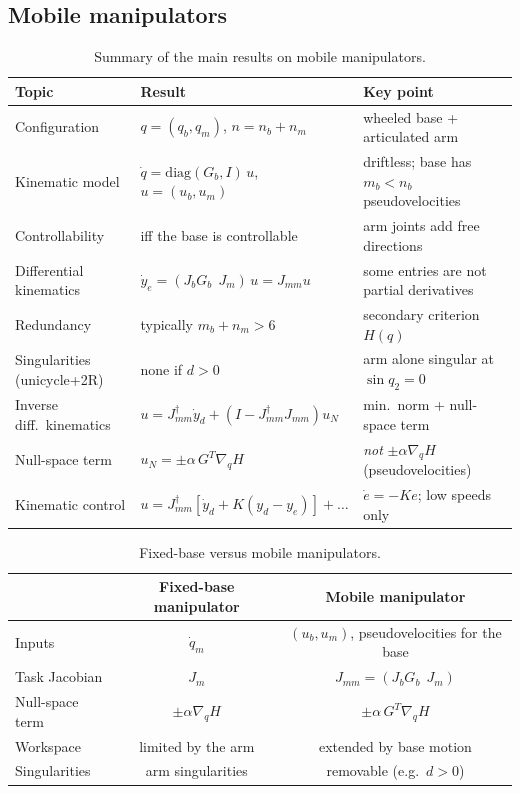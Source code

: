 \documentclass[11pt,a4paper]{article}
\def\bm#1{#1}%
\newcommand{\qbase}{\bm{q}_b}
\newcommand{\qarm}{\bm{q}_m}
\newcommand{\ubase}{\bm{u}_b}
\newcommand{\uarm}{\bm{u}_m}
\newcommand{\Gbase}{\bm{G}_b}
\newcommand{\Jbase}{\bm{J}_b}
\newcommand{\Jarm}{\bm{J}_m}
\newcommand{\Jmm}{\bm{J}_{mm}}
\newcommand{\ye}{\bm{y}_e}
\newcommand{\grad}{\nabla_{\!\bm{q}}}
\theoremstyle{definition}
\theoremstyle{plain}
\theoremstyle{remark}
\begin{document}
\subsection*{Mobile manipulators}

\begin{table}[ht]
\centering
\renewcommand{\arraystretch}{1.3}
\begin{tabular}{@{}>{\raggedright\arraybackslash}p{3.2cm}>{\raggedright\arraybackslash}p{6.4cm}>{\raggedright\arraybackslash}p{5.2cm}@{}}
\toprule
\textbf{Topic} & \textbf{Result} & \textbf{Key point}\\
\midrule
Configuration & $\bm q=(\qbase,\qarm)$, $n=n_b+n_m$ & wheeled base + articulated arm\\
Kinematic model & $\dot{\bm q}=\mathrm{diag}(\Gbase,\bm I)\,\bm u$, $\bm u=(\ubase,\uarm)$ & driftless; base has $m_b<n_b$ pseudovelocities\\
Controllability & iff the base is controllable & arm joints add free directions\\
Differential kinematics & $\dot{\bm y}_e=(\Jbase\Gbase\ \ \Jarm)\,\bm u=\Jmm\bm u$ & some entries are not partial derivatives\\
Redundancy & typically $m_b+n_m>6$ & secondary criterion $H(\bm q)$\\
Singularities (unicycle+2R) & none if $d>0$ & arm alone singular at $\sin q_2=0$\\
Inverse diff.\ kinematics & $\bm u=\Jmm^\dagger\dot{\bm y}_d+(\bm I-\Jmm^\dagger\Jmm)\bm u_N$ & min.\ norm + null-space term\\
Null-space term & $\bm u_N=\pm\alpha\,\bm G^T\grad H$ & \emph{not} $\pm\alpha\grad H$ (pseudovelocities)\\
Kinematic control & $\bm u=\Jmm^\dagger[\dot{\bm y}_d+\bm K(\bm y_d-\ye)]+\dots$ & $\dot{\bm e}=-\bm K\bm e$; low speeds only\\
\bottomrule
\end{tabular}
\caption{Summary of the main results on mobile manipulators.}
\end{table}

\begin{table}[ht]
\centering
\renewcommand{\arraystretch}{1.3}
\begin{tabular}{@{}lcc@{}}
\toprule
 & \textbf{Fixed-base manipulator} & \textbf{Mobile manipulator}\\
\midrule
Inputs & $\dot{\bm q}_m$ & $(\ubase,\uarm)$, pseudovelocities for the base\\
Task Jacobian & $\Jarm$ & $\Jmm=(\Jbase\Gbase\ \ \Jarm)$\\
Null-space term & $\pm\alpha\grad H$ & $\pm\alpha\,\bm G^T\grad H$\\
Workspace & limited by the arm & extended by base motion\\
Singularities & arm singularities & removable (e.g.\ $d>0$)\\
\bottomrule
\end{tabular}
\caption{Fixed-base versus mobile manipulators.}
\end{table}
\end{document}
